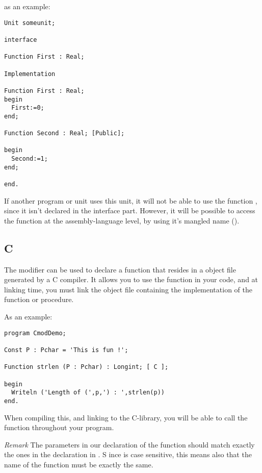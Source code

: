 \documentclass{report}
\begin{document}
as an example:
\begin{CodEx}
\begin{verbatim}
Unit someunit;

interface

Function First : Real;

Implementation

Function First : Real;
begin
  First:=0;
end;

Function Second : Real; [Public];

begin
  Second:=1;
end;

end.
\end{verbatim} 
\end{CodEx}
If another program or unit uses this unit, it will not be able to use the
function , since it isn't declared in the interface part.
However, it will be possible to access the function  at the
assembly-language level, by using it's mangled name (\progref).

\subsection{C}
The  modifier can be used to declare a function that resides in a
object file generated by a C compiler. It allows you to use the function in
your code, and at linking time, you must link the object file containing the
 implementation of the function or procedure.

As an example:
\begin{CodEx}
\begin{verbatim}
program CmodDemo;

Const P : Pchar = 'This is fun !';

Function strlen (P : Pchar) : Longint; [ C ];

begin
  Writeln ('Length of (',p,') : ',strlen(p))
end.
\end{verbatim}
\end{CodEx}
When compiling this, and linking to the C-library, you will be able to call
the  function throughout your program.

{\em Remark} The parameters in our declaration of the  function should 
match exactly the ones in the declaration in . S
ince  is case sensitive, this means also that the name of the
function must be exactly the same.
\end{document}
